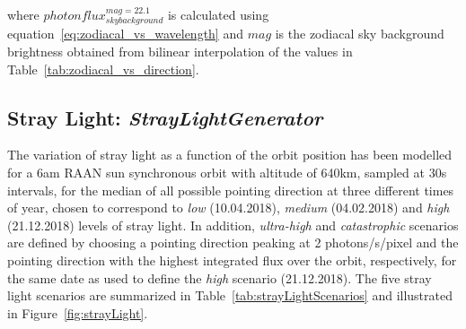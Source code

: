 \documentclass[11pt]{article}      %
\def\HCode#1{}
\def\htmlanchor#1{\HCode{<a id="#1"></a>}}
\begin{document}
where $photonflux_{skybackground}^{mag=22.1}$ is calculated using equation~\ref{eq:zodiacal_vs_wavelength} and $mag$ is the zodiacal sky background brightness obtained from bilinear interpolation of the values in Table~\ref{tab:zodiacal_vs_direction}.


\clearpage
\htmlanchor{StrayLightGenerator}
\subsection{Stray Light:  {\it StrayLightGenerator}}
\label{sec:StrayLightGenerator}

The variation of stray light as a function of the orbit position has been modelled for a 6am RAAN sun synchronous orbit with altitude of 640km, sampled at 30s intervals, for the median of all possible pointing direction at three different times of year, chosen to correspond to {\it low} (10.04.2018), {\it medium} (04.02.2018) and {\it high} (21.12.2018) levels of stray light. In addition, {\it ultra-high} and {\it catastrophic} scenarios are defined by choosing a pointing direction peaking at 2 photons/s/pixel and the pointing direction with the highest integrated flux over the orbit, respectively, for the same date as used to define the {\it high} scenario (21.12.2018). The five stray light scenarios are summarized in Table~\ref{tab:strayLightScenarios} and illustrated in Figure~\ref{fig:strayLight}.
\end{document}
